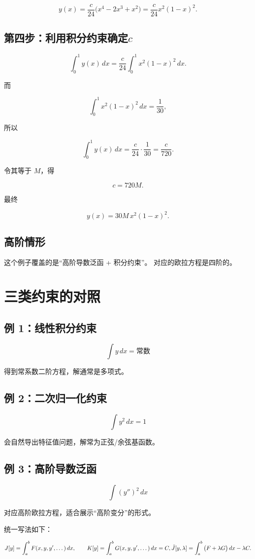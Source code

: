 \[
y(x)
=
\frac{c}{24}\big(x^4-2x^3+x^2\big)
=
\frac{c}{24}x^2(1-x)^2.
\]

\subsection{第四步：利用积分约束确定\( c\)}

\[
\int_0^1 y(x)\,dx
=
\frac{c}{24}\int_0^1 x^2(1-x)^2\,dx.
\]

而

\[
\int_0^1 x^2(1-x)^2\,dx=\frac{1}{30},
\]

所以

\[
\int_0^1 y(x)\,dx
=
\frac{c}{24}\cdot\frac{1}{30}
=
\frac{c}{720}.
\]

令其等于 \(M\)，得

\[
c=720M.
\]

最终

\[
\boxed{
y(x)=30M\,x^2(1-x)^2
}.
\]

\subsection{高阶情形}

这个例子覆盖的是“高阶导数泛函 + 积分约束”。
对应的欧拉方程是四阶的。

\section{三类约束的对照}

\subsection{例 1：线性积分约束}

\[
\int y\,dx = \text{常数}
\]

得到常系数二阶方程，解通常是多项式。

\subsection{例 2：二次归一化约束}

\[
\int y^2\,dx = 1
\]

会自然导出特征值问题，解常为正弦/余弦基函数。

\subsection{例 3：高阶导数泛函}

\[
\int (y'')^2\,dx
\]

对应高阶欧拉方程，适合展示“高阶变分”的形式。

统一写法如下：

\[
J[y]=\int_a^b F(x,y,y',\dots)\,dx,
\qquad
K[y]=\int_a^b G(x,y,y',\dots)\,dx=C, \\
\tilde J[y,\lambda]
=
\int_a^b \big(F+\lambda G\big)\,dx-\lambda C.
\]
